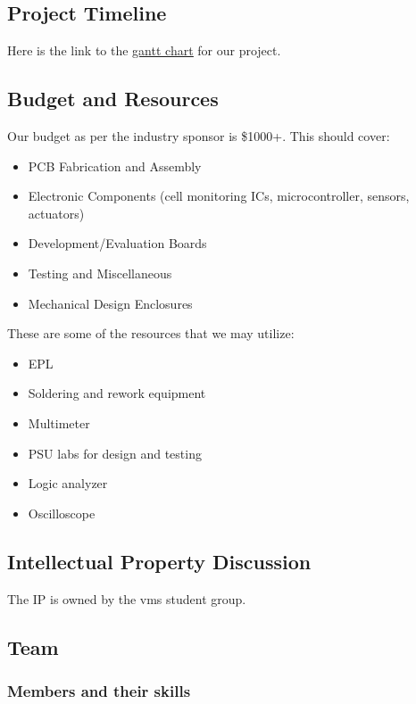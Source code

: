 \subsection{Project Timeline}

Here is the link to the \href{https://docs.google.com/spreadsheets/d/1yp_52nIF2XpA4CjM_36LT811xkz6WF1V7Pj9z-nbfzA/edit?usp=sharing}{\underline{gantt chart}} for our project.

\subsection{Budget and Resources}
Our budget as per the industry sponsor is \$1000+. This should cover:
\begin{itemize}
	\item PCB Fabrication and Assembly
	\item Electronic Components (cell monitoring ICs, microcontroller, sensors, actuators)
	\item Development/Evaluation Boards
	\item Testing and Miscellaneous
	\item Mechanical Design Enclosures
\end{itemize}
These are some of the resources that we may utilize:
\begin{itemize}
	\item EPL
	\item Soldering and rework equipment
	\item Multimeter
	\item PSU labs for design and testing
	\item Logic analyzer
	\item Oscilloscope
\end{itemize}

\subsection{Intellectual Property Discussion}
The IP is owned by the \gls{vms} student group.

\subsection{Team}

\subsubsection{Members and their skills}

